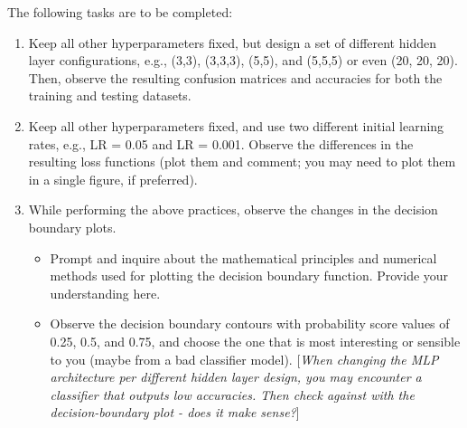 \documentclass[12pt]{article}
\begin{document}
The following tasks are to be completed:
\begin{enumerate}
    \item Keep all other hyperparameters fixed, but design a set of different hidden layer configurations, e.g., (3,3), (3,3,3), (5,5), and (5,5,5) or even (20, 20, 20). Then, observe the resulting confusion matrices and accuracies for both the training and testing datasets. 
    \item Keep all other hyperparameters fixed, and use two different initial learning rates, e.g., LR = 0.05 and LR = 0.001. Observe the differences in the resulting loss functions (plot them and comment; you may need to plot them in a single figure, if preferred).
    \item While performing the above practices, observe the changes in the decision boundary plots. 
    \begin{itemize}
        \item Prompt and inquire about the mathematical principles and numerical methods used for plotting the decision boundary function. Provide your understanding here. 
        \item Observe the decision boundary contours with probability score values of 0.25, 0.5, and 0.75, and choose the one that is most interesting or sensible to you (maybe from a bad classifier model). 
        [\textit{When changing the MLP architecture per different hidden layer design, you may encounter a classifier that outputs low accuracies. Then check against with the decision-boundary plot - does it make sense?}]
    \end{itemize}
\end{enumerate}
\end{document}

